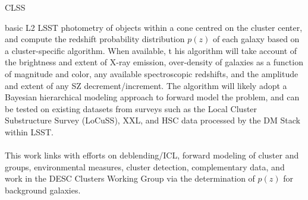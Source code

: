 {\begin{tasklist}{CLSS}
\begin{task}
{basic L2 LSST photometry of objects within a cone centred on the
cluster center, and compute the redshift probability distribution
$p(z)$ of each galaxy based on a
cluster-specific algorithm. When available, t
his algorithm will take account of the brightness and extent of X-ray
emission, over-density of galaxies as a function of magnitude and
color, any available spectroscopic redshifts, and the amplitude and extent of
any SZ decrement/increment. The algorithm will likely adopt a Bayesian
hierarchical modeling approach to forward model the problem,
and can be tested on existing datasets from surveys such as the
Local Cluster Substructure Survey (LoCuSS), XXL, and HSC data processed by
the DM Stack within LSST.\\
~\\
This work links with efforts on deblending/ICL, forward modeling
of cluster and groups, environmental measures, cluster detection,
complementary data, and work in the DESC Clusters Working Group via 
the determination of $p(z)$ for background galaxies.}
~\\
\end{task}




\end{tasklist}}
